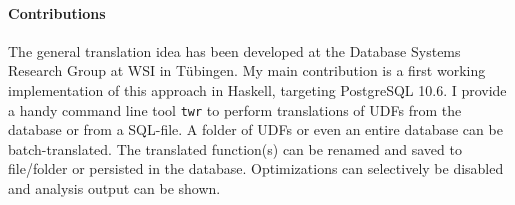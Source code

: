 



    
\paragraph*{Contributions} The general translation idea has been developed at the Database Systems Research Group at WSI in Tübingen. My main contribution is a first working implementation of this approach in Haskell, targeting PostgreSQL 10.6. I provide a handy command line tool \texttt{twr} to perform translations of UDFs from the database or from a SQL-file. A folder of UDFs or even an entire database can be batch-translated. The translated function(s) can be renamed and saved to file/folder or persisted in the database. Optimizations can selectively be disabled and analysis output can be shown.

